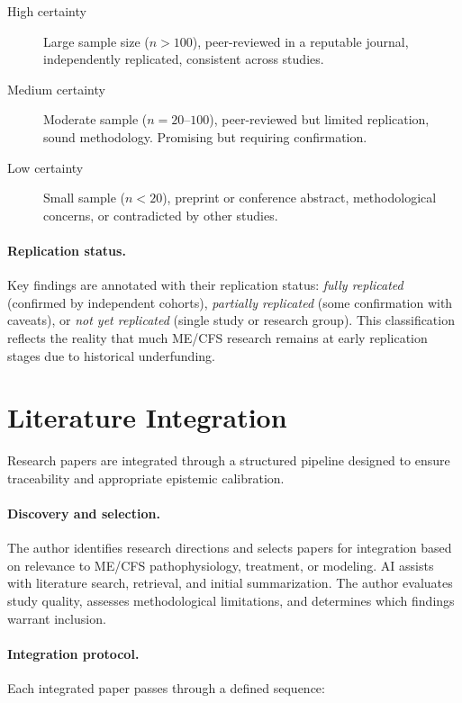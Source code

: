\begin{description}
\item[High certainty] Large sample size ($n > 100$), peer-reviewed in a reputable journal, independently replicated, consistent across studies.

\item[Medium certainty] Moderate sample ($n = 20$--$100$), peer-reviewed but limited replication, sound methodology. Promising but requiring confirmation.

\item[Low certainty] Small sample ($n < 20$), preprint or conference abstract, methodological concerns, or contradicted by other studies.
\end{description}

\paragraph{Replication status.}
Key findings are annotated with their replication status: \emph{fully replicated} (confirmed by independent cohorts), \emph{partially replicated} (some confirmation with caveats), or \emph{not yet replicated} (single study or research group). This classification reflects the reality that much ME/CFS research remains at early replication stages due to historical underfunding.

\section*{Literature Integration}
\label{sec:meth-literature}

Research papers are integrated through a structured pipeline designed to ensure traceability and appropriate epistemic calibration.

\paragraph{Discovery and selection.}
The author identifies research directions and selects papers for integration based on relevance to ME/CFS pathophysiology, treatment, or modeling. AI assists with literature search, retrieval, and initial summarization. The author evaluates study quality, assesses methodological limitations, and determines which findings warrant inclusion.

\paragraph{Integration protocol.}
Each integrated paper passes through a defined sequence:

